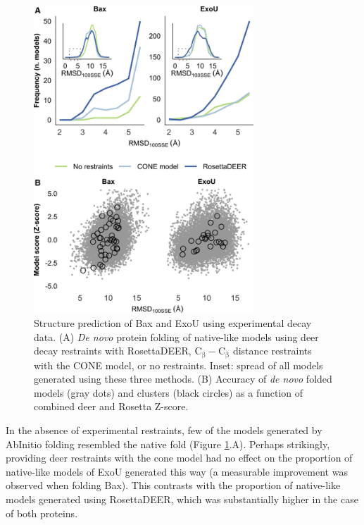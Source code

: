 \begin{figure}
    \centering
    \includegraphics[width=3.25in]{Figures/rosettadeer_main_folding.jpg}
     \caption[Structure prediction of Bax and ExoU using experimental decay data.]{Structure prediction of Bax and ExoU using experimental decay data. (A) \emph{De novo} protein folding of native-like models using \gls{deer} decay restraints with RosettaDEER, $\mathrm{C_{\upbeta}}-\mathrm{C_{\upbeta}}$ distance restraints with the CONE model, or no restraints. Inset: spread of all models generated using these three methods. (B) Accuracy of \emph{de novo} folded models (gray dots) and clusters (black circles) as a function of combined \gls{deer} and Rosetta Z-score.}
    \label{fig:rosettadeer_main_folding}
\end{figure}

In the absence of experimental restraints, few of the models generated by AbInitio folding resembled the native fold (Figure \ref{fig:rosettadeer_main_folding}.A). Perhaps strikingly, providing \gls{deer} restraints with the \gls{cone} model had no effect on the proportion of native-like models of ExoU generated this way (a measurable improvement was observed when folding Bax). This contrasts with the proportion of native-like models generated using RosettaDEER, which was substantially higher in the case of both proteins.

